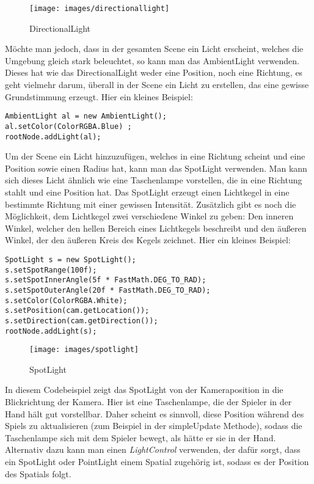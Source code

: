 \begin{figure}[h!]
	
	
	
	\centering\texttt{[image: images/directionallight]} 
	\caption[DirectionalLight]{DirectionalLight\cite{Abb567}}
	
\end{figure}

\newpage

Möchte man jedoch, dass in der gesamten Scene ein Licht erscheint, welches die Umgebung gleich stark beleuchtet, so kann man das AmbientLight verwenden. Dieses hat wie das DirectionalLight weder eine Position, noch eine Richtung, es geht vielmehr darum, überall in der Scene ein Licht zu erstellen, das eine gewisse Grundstimmung erzeugt. Hier ein kleines Beispiel:

\begin{lstlisting}
AmbientLight al = new AmbientLight();
al.setColor(ColorRGBA.Blue) ;
rootNode.addLight(al);
\end{lstlisting}

Um der Scene ein Licht hinzuzufügen, welches in eine Richtung scheint und eine Position sowie einen Radius hat, kann man das SpotLight verwenden. Man kann sich dieses Licht ähnlich wie eine Taschenlampe vorstellen, die in eine Richtung stahlt und eine Position hat. Das SpotLight erzeugt einen Lichtkegel in eine bestimmte Richtung mit einer gewissen Intensität. Zusätzlich gibt es noch die Möglichkeit, dem Lichtkegel zwei verschiedene Winkel zu geben: Den inneren Winkel, welcher den hellen Bereich eines Lichtkegels beschreibt und den äußeren Winkel, der den äußeren Kreis des Kegels zeichnet. Hier ein kleines Beispiel:
\begin{lstlisting}
SpotLight s = new SpotLight();
s.setSpotRange(100f);                           
s.setSpotInnerAngle(5f * FastMath.DEG_TO_RAD); 
s.setSpotOuterAngle(20f * FastMath.DEG_TO_RAD); 
s.setColor(ColorRGBA.White); 
s.setPosition(cam.getLocation());         
s.setDirection(cam.getDirection());     
rootNode.addLight(s);
\end{lstlisting}

\begin{figure}[H]
	
	
	
	\centering\texttt{[image: images/spotlight]} 
	\caption{SpotLight}
	\cite{Abb567}
	
\end{figure}
In diesem Codebeispiel zeigt das SpotLight von der Kameraposition in die Blickrichtung der Kamera. Hier ist eine Taschenlampe, die der Spieler in der Hand hält gut vorstellbar. Daher scheint es sinnvoll, diese Position während des Spiels zu aktualisieren (zum Beispiel in der simpleUpdate Methode), sodass die Taschenlampe sich mit dem Spieler bewegt, als hätte er sie in der Hand. Alternativ dazu kann man einen \emph{LightControl} verwenden, der dafür sorgt, dass ein SpotLight oder PointLight einem Spatial zugehörig ist, sodass es der Position des Spatials folgt.



